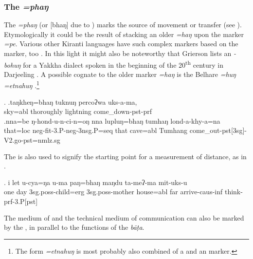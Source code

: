 \subsubsection{The   \emph{=phaŋ}}\label{case-abl}	

The  \emph{=phaŋ} (or [bhaŋ] due to ) marks the source of movement or transfer (see \Next). Etymologically it could be the result of stacking an older  \emph{=haŋ} upon the  marker \emph{=pe}. Various other Kiranti languages have such complex  markers based on the  marker, too \citep[81]{Ebert1994The-structure}. In this light it might also be noteworthy that Grierson lists an  \emph{-bohuŋ}  for a Yakkha dialect spoken in the beginning of the 20\textsuperscript{th} century  in Darjeeling \citep{Grierson1909Linguistic}. A possible cognate to the older marker \emph{=haŋ} is the  Belhare  \emph{=huŋ \ti =etnahuŋ} \citep[549]{Bickel2003Belhare}.\footnote{The form \emph{=etnahuŋ} is most probably also combined of a  and an  marker.}

\ex. \ag.taŋkheŋ=bhaŋ   tuknuŋ    percoʔwa uks-a-ma,\\
sky{\sc =abl} thoroughly lightning come\_down{\sc [3sg]-pst-prf}\\
\bg.nna=be     ŋ-hond-u-n-ci-n=oŋ                            nna  lupluŋ=bhaŋ   tumhaŋ lond-a-khy-a=na\\
that{\sc =loc} {\sc neg-}fit{\sc -3.P-neg-3nsg.P=seq} that  cave{\sc =abl} Tumhang come\_out{\sc -pst[3sg]-V2.go-pst=nmlz.sg}\\


The  is also used to signify the starting point for a measurement of distance, as in \Next.

\exg. i   let u-cya=ŋa              u-ma              paŋ=bhaŋ    maŋdu ta-meʔ-ma             mit-uks-u\\
one day {\sc 3sg.poss-}child{\sc =erg} {\sc 3sg.poss-}mother house{\sc =abl} far arrive{\sc -caus-inf} think{\sc -prf-3.P[pst]}\\

The medium of  and the technical medium of communication can also be marked by  the ,  in parallel to the functions of the   \emph{bāṭa}. 

